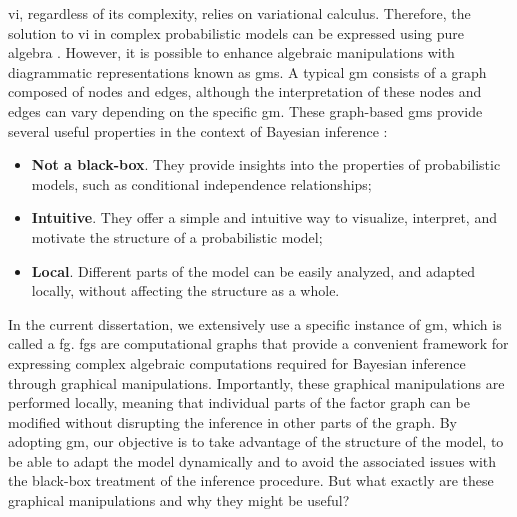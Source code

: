 \Ac{vi}, regardless of its complexity, relies on variational calculus. 
Therefore, the solution to \ac{vi} in complex probabilistic models can be expressed using
pure algebra \citep{blei_variational_2017}.
However, it is possible to enhance algebraic manipulations with diagrammatic representations
known as \acp{gm}. 
A typical \ac{gm} consists of a graph composed of nodes and edges,
although the interpretation of these nodes and edges can vary depending on the specific \ac{gm}.
These graph-based \acp{gm} provide several useful properties in the context of Bayesian inference \citep[Ch.8]{bishop_pattern_2006}:
\begin{itemize}
\item \textbf{Not a black-box}. They provide insights into the properties of probabilistic models, such as conditional independence relationships;
  \item \textbf{Intuitive}. They offer a simple and intuitive way to visualize, interpret, and motivate the structure of a probabilistic model;
  \item \textbf{Local}. Different parts of the model can be easily analyzed, and adapted locally, without affecting the structure as a whole.
\end{itemize}

In the current dissertation, we extensively use a specific instance of \ac{gm}, which is called a \ac{fg}. 
\Acp{fg} are computational graphs that provide a convenient framework for expressing complex algebraic computations required for Bayesian inference through graphical manipulations.
Importantly, these graphical manipulations are performed locally, meaning that individual parts of the
factor graph can be modified without disrupting the inference in other parts of the graph.
By adopting \ac{gm}, our objective is to take advantage of the structure of the model, to be able to adapt the model dynamically and to avoid the associated issues with the black-box treatment of the inference procedure.
But what exactly are these graphical manipulations and why they might be useful?

